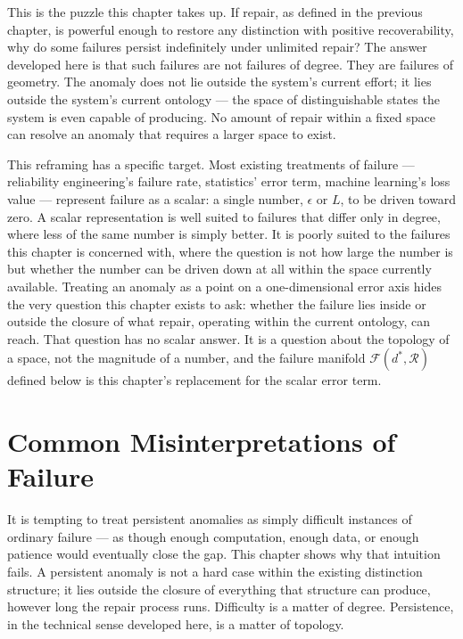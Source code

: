 \documentclass[12pt,twoside,openright]{book}
\begin{document}
This is the puzzle this chapter takes up. If repair, as
defined in the previous chapter, is powerful enough to
restore any distinction with positive recoverability, why
do some failures persist indefinitely under unlimited
repair? The answer developed here is that such failures are
not failures of degree. They are failures of geometry. The
anomaly does not lie outside the system's current effort; it
lies outside the system's current ontology --- the space of
distinguishable states the system is even capable of
producing. No amount of repair within a fixed space can
resolve an anomaly that requires a larger space to exist.

This reframing has a specific target. Most existing
treatments of failure --- reliability engineering's failure
rate, statistics' error term, machine learning's loss value
--- represent failure as a scalar: a single number,
$\epsilon$ or $L$, to be driven toward zero. A scalar
representation is well suited to failures that differ only
in degree, where less of the same number is simply better.
It is poorly suited to the failures this chapter is
concerned with, where the question is not how large the
number is but whether the number can be driven down at all
within the space currently available. Treating an anomaly as
a point on a one-dimensional error axis hides the very
question this chapter exists to ask: whether the failure
lies inside or outside the closure of what repair, operating
within the current ontology, can reach. That question has no
scalar answer. It is a question about the topology of a
space, not the magnitude of a number, and the failure
manifold $\mathcal{F}(d^*,\mathcal{R})$ defined below is this
chapter's replacement for the scalar error term.

\section{Common Misinterpretations of Failure}
\label{sec:ch8-misinterpretations}

It is tempting to treat persistent anomalies as simply
difficult instances of ordinary failure --- as though enough
computation, enough data, or enough patience would
eventually close the gap. This chapter shows why that
intuition fails. A persistent anomaly is not a hard case
within the existing distinction structure; it lies outside
the closure of everything that structure can produce,
however long the repair process runs. Difficulty is a matter
of degree. Persistence, in the technical sense developed
here, is a matter of topology.
\end{document}
